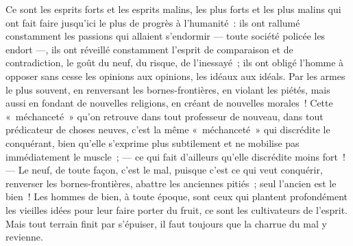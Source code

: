 {Ce sont les esprits forts et les esprits malins, les plus forts et les plus malins qui ont fait faire jusqu'ici le plus de progrès à l'humanité~: ils ont rallumé constamment les passions qui allaient s'endormir --- toute société policée les endort ---, ils ont réveillé constamment l'esprit de comparaison et de contradiction, le goût du neuf, du risque, de l'inessayé~; ils ont obligé l'homme à opposer sans cesse les opinions aux opinions, les idéaux aux idéals. Par les armes le plus souvent, en renversant les bornes-frontières, en violant les piétés, mais aussi en fondant de nouvelles religions, en créant de nouvelles morales~! Cette «~méchanceté~» qu'on retrouve dans tout professeur de nouveau, dans tout prédicateur de choses neuves, c'est la même «~méchanceté~» qui discrédite le conquérant, bien qu'elle s'exprime plus subtilement et ne mobilise pas immédiatement le muscle~; --- ce qui fait d'ailleurs qu'elle discrédite moins fort~! --- Le neuf, de toute façon, c'est le mal, puisque c'est ce qui veut conquérir, renverser les bornes-frontières, abattre les anciennes pitiés~; seul l'ancien est le bien~! Les hommes de bien, à toute époque, sont ceux qui plantent profondément les vieilles idées pour leur faire porter du fruit, ce sont les cultivateurs de l'esprit. Mais tout terrain finit par s'épuiser, il faut toujours que la charrue du mal y revienne.
}


